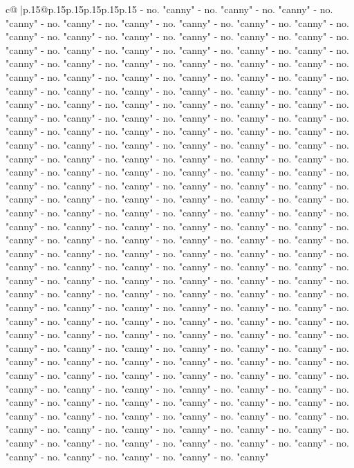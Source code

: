 \documentclass{article}
\begin{document}
{\begin{supertabular}{c@{$\;$}|p{.15\linewidth}@{}p{.15\linewidth}p{.15\linewidth}p{.15\linewidth}p{.15\linewidth}p{.15\linewidth}}
{{{{-} no. "canny" {-} no. "canny" {-} no. "canny" {-} no. "canny" {-} no. "canny" {-} no. "canny" {-} no. "canny" {-} no. "canny" {-} no. "canny" {-} no. "canny" {-} no. "canny" {-} no. "canny" {-} no. "canny" {-} no. "canny" {-} no. "canny" {-} no. "canny" {-} no. "canny" {-} no. "canny" {-} no. "canny" {-} no. "canny" {-} no. "canny" {-} no. "canny" {-} no. "canny" {-} no. "canny" {-} no. "canny" {-} no. "canny" {-} no. "canny" {-} no. "canny" {-} no. "canny" {-} no. "canny" {-} no. "canny" {-} no. "canny" {-} no. "canny" {-} no. "canny" {-} no. "canny" {-} no. "canny" {-} no. "canny" {-} no. "canny" {-} no. "canny" {-} no. "canny" {-} no. "canny" {-} no. "canny" {-} no. "canny" {-} no. "canny" {-} no. "canny" {-} no. "canny" {-} no. "canny" {-} no. "canny" {-} no. "canny" {-} no. "canny" {-} no. "canny" {-} no. "canny" {-} no. "canny" {-} no. "canny" {-} no. "canny" {-} no. "canny" {-} no. "canny" {-} no. "canny" {-} no. "canny" {-} no. "canny" {-} no. "canny" {-} no. "canny" {-} no. "canny" {-} no. "canny" {-} no. "canny" {-} no. "canny" {-} no. "canny" {-} no. "canny" {-} no. "canny" {-} no. "canny" {-} no. "canny" {-} no. "canny" {-} no. "canny" {-} no. "canny" {-} no. "canny" {-} no. "canny" {-} no. "canny" {-} no. "canny" {-} no. "canny" {-} no. "canny" {-} no. "canny" {-} no. "canny" {-} no. "canny" {-} no. "canny" {-} no. "canny" {-} no. "canny" {-} no. "canny" {-} no. "canny" {-} no. "canny" {-} no. "canny" {-} no. "canny" {-} no. "canny" {-} no. "canny" {-} no. "canny" {-} no. "canny" {-} no. "canny" {-} no. "canny" {-} no. "canny" {-} no. "canny" {-} no. "canny" {-} no. "canny" {-} no. "canny" {-} no. "canny" {-} no. "canny" {-} no. "canny" {-} no. "canny" {-} no. "canny" {-} no. "canny" {-} no. "canny" {-} no. "canny" {-} no. "canny" {-} no. "canny" {-} no. "canny" {-} no. "canny" {-} no. "canny" {-} no. "canny" {-} no. "canny" {-} no. "canny" {-} no. "canny" {-} no. "canny" {-} no. "canny" {-} no. "canny" {-} no. "canny" {-} no. "canny" {-} no. "canny" {-} no. "canny" {-} no. "canny" {-} no. "canny" {-} no. "canny" {-} no. "canny" {-} no. "canny" {-} no. "canny" {-} no. "canny" {-} no. "canny" {-} no. "canny" {-} no. "canny" {-} no. "canny" {-} no. "canny" {-} no. "canny" {-} no. "canny" {-} no. "canny" {-} no. "canny" {-} no. "canny" {-} no. "canny" {-} no. "canny" {-} no. "canny" {-} no. "canny" {-} no. "canny" {-} no. "canny" {-} no. "canny" {-} no. "canny" {-} no. "canny" {-} no. "canny" {-} no. "canny" {-} no. "canny" {-} no. "canny" {-} no. "canny" {-} no. "canny" {-} no. "canny" {-} no. "canny" {-} no. "canny" {-} no. "canny" {-} no. "canny" {-} no. "canny" {-} no. "canny" {-} no. "canny" {-} no. "canny" {-} no. "canny" {-} no. "canny" {-} no. "canny" {-} no. "canny" {-} no. "canny" {-} no. "canny" {-} no. "canny" {-} no. "canny" {-} no. "canny" {-} no. "canny" {-} no. "canny" {-} no. "canny" {-} no. "canny" {-} no. "canny" {-} no. "canny" {-} no. "canny" {-} no. "canny" {-} no. "canny" {-} no. "canny" {-} no. "canny" {-} no. "canny" {-} no. "canny" {-} no. "canny" {-} no. "canny" {-} no. "canny" {-} no. "canny" {-} no. "canny" {-} no. "canny" {-} no. "canny" {-} no. "canny" {-} no. "canny" {-} no. "canny" {-} no. "canny" }}}
\end{supertabular}}
\end{document}
